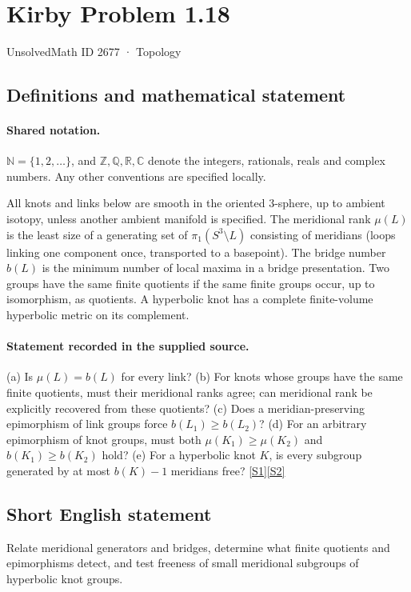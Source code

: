 \documentclass[11pt]{article}
\newcommand{\sref}[2]{\hyperlink{source:#1:#2}{[S#2]}}
\begin{document}
\setcounter{section}{2676}
\section{Kirby Problem 1.18}\label{2677}
{\small\sffamily UnsolvedMath ID 2677 · Topology}
\subsection{Definitions and mathematical statement}

\paragraph{Shared notation.}$\mathbb N=\{1,2,\ldots\}$, and $\mathbb Z,\mathbb Q,\mathbb R,\mathbb C$ denote the integers, rationals, reals and complex numbers. Any other conventions are specified locally.


All knots and links below are smooth in the oriented $3$-sphere, up to ambient isotopy, unless another ambient manifold is specified. The meridional rank $\mu(L)$ is the least size of a generating set of $\pi_1(S^3\setminus L)$ consisting of meridians (loops linking one component once, transported to a basepoint). The bridge number $b(L)$ is the minimum number of local maxima in a bridge presentation. Two groups have the same finite quotients if the same finite groups occur, up to isomorphism, as quotients. A hyperbolic knot has a complete finite-volume hyperbolic metric on its complement.
\paragraph{Statement recorded in the supplied source.}
(a) Is $\mu(L)=b(L)$ for every link? (b) For knots whose groups have the same finite quotients, must their meridional ranks agree; can meridional rank be explicitly recovered from these quotients? (c) Does a meridian-preserving epimorphism of link groups force $b(L_1)\geq b(L_2)$? (d) For an arbitrary epimorphism of knot groups, must both $\mu(K_1)\geq\mu(K_2)$ and $b(K_1)\geq b(K_2)$ hold? (e) For a hyperbolic knot $K$, is every subgroup generated by at most $b(K)-1$ meridians free? \sref{2677}{1}\sref{2677}{2}
\subsection{Short English statement}
Relate meridional generators and bridges, determine what finite quotients and epimorphisms detect, and test freeness of small meridional subgroups of hyperbolic knot groups.
\end{document}
